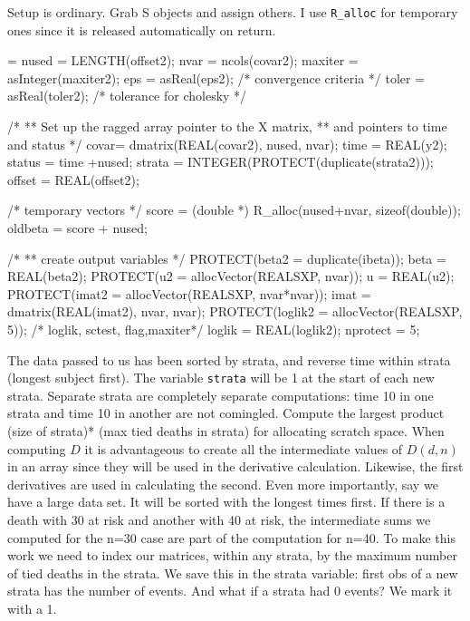 \documentclass{article}
\begin{document}
Setup is ordinary.  Grab S objects and assign others.
I use \verb!R_alloc! for temporary ones since it is released automatically on
return.
\begin{nwchunk}
=
 nused = LENGTH(offset2);
 nvar  = ncols(covar2);
 maxiter = asInteger(maxiter2);
 eps  = asReal(eps2);     /* convergence criteria */
 toler = asReal(toler2);  /* tolerance for cholesky */
 
 /*
 **  Set up the ragged array pointer to the X matrix,
 **    and pointers to time and status
 */
 covar= dmatrix(REAL(covar2), nused, nvar);
 time = REAL(y2);
 status = time +nused;
 strata = INTEGER(PROTECT(duplicate(strata2)));
 offset = REAL(offset2);
 
 /* temporary vectors */
 score = (double *) R_alloc(nused+nvar, sizeof(double));
 oldbeta = score + nused;
 
 /* 
 ** create output variables
 */ 
 PROTECT(beta2 = duplicate(ibeta));
 beta = REAL(beta2);
 PROTECT(u2 = allocVector(REALSXP, nvar));
 u = REAL(u2);
 PROTECT(imat2 = allocVector(REALSXP, nvar*nvar)); 
 imat = dmatrix(REAL(imat2),  nvar, nvar);
 PROTECT(loglik2 = allocVector(REALSXP, 5)); /* loglik, sctest, flag,maxiter*/
 loglik = REAL(loglik2);
 nprotect = 5;
\end{nwchunk}

The data passed to us has been sorted by strata, and 
reverse time within strata (longest subject first).
The variable \Verb!strata! will be 1 at the start of each new strata.
Separate strata are completely separate computations: time 10 in
one strata and time 10 in another are not comingled.
Compute the largest product (size of strata)*
(max tied deaths in strata) for allocating scratch space.
When computing $D$ it is advantageous to create all the intermediate
values of $D(d,n)$ in an array since they will be used in the
derivative calculation.  Likewise, the first derivatives are used
in calculating the second.
Even more importantly, say we have a large data set.  It will
be sorted with the longest times first.
If there is a death with 30 at risk and another with 40 at
risk, the intermediate sums we computed for the n=30 case
are part of the computation for n=40.  To make this
work we need to index our matrices, within any strata,
by the maximum number of tied deaths in the strata.
We save this in the strata variable: first obs of a new
strata has the number of events.
And what if a strata had 0 events?  We mark it with a 1.
\end{document}
